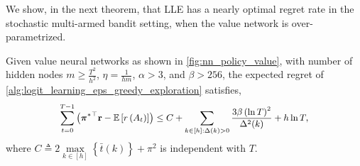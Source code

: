We show, in the next theorem, that LLE has a nearly optimal regret rate in the stochastic multi-armed bandit setting, when the value network is over-parametrized.
\begin{thm}
\label{thm:logit_learning_main_result}
    Given value neural networks as shown in \cref{fig:nn_policy_value}, with number of hidden nodes $m \ge \frac{T^2}{h^2}$, $\eta = \frac{1}{h m}$,  $\alpha > 3$, and $\beta > 256$, the expected regret of \cref{alg:logit_learning_eps_greedy_exploration} satisfies,
\begin{equation*}
\small
\begin{split}
    \sum\limits_{t=0}^{T-1}{ \left( {\rvpi^*}^\top \rvr - \sE \left[ r\left(A_t\right) \right] \right)}  \le C + \sum\limits_{k \in [h] : \Delta(k) > 0}{ \frac{ 3 \beta \left( \ln{T} \right)^2}{\Delta^2(k)} }  + h \ln{T},
\end{split}
\end{equation*}
where $C \triangleq 2 \max\limits_{k \in [h]}\left\{ \bar{t}(k) \right\} + \pi^2$ is independent with $T$.
\end{thm}
